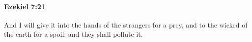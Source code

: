 
		\paragraph{Ezekiel 7:21} %
			\label{EZEKIEL-7-21}

			And I will give it into the hands of the strangers for a prey, and to the wicked of the earth for a spoil; and they shall pollute it.


